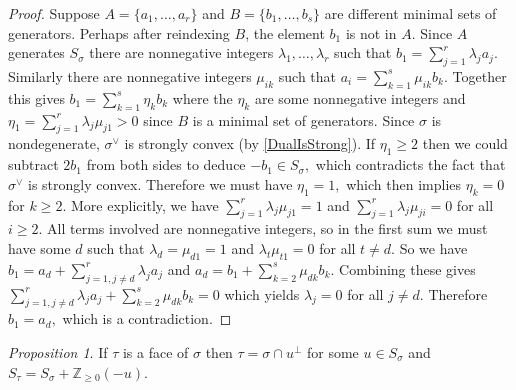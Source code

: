 \documentclass[BSc]{usydthesis}
\numberwithin{equation}{chapter}
\theoremstyle{remark}
\newtheorem{Proposition}[equation]{Proposition}
\newcommand{\Z}{\mathbb{Z}}
\newcommand{\V}{\vee}
\begin{document}
\begin{proof}
 Suppose $A=\{ a_1,\ldots, a_r \}$ and $B=\{ b_1, \ldots, b_s\}$ are different minimal sets of generators. Perhaps after reindexing $B$, the element $b_1$ is not in $A.$ Since $A$ generates $S_{\sigma}$ there are nonnegative integers $\lambda_1,\ldots, \lambda_r$ such that $b_1 =\displaystyle \sum_{j=1}^r \lambda_j a_j.$ Similarly there are nonnegative integers $\mu_{ik}$ such that $a_i =\displaystyle  \sum_{k=1}^s \mu_{ik} b_k.$ Together this gives $b_1 =\displaystyle  \sum_{k=1}^s \eta_k b_k$ where the $\eta_k$ are some nonnegative integers and $\eta_1 =\displaystyle  \sum_{j=1}^r \lambda_j \mu_{j1} >0$ since $B$ is a minimal set of generators. Since $\sigma$ is nondegenerate, $\sigma^{\V}$ is strongly convex (by \ref{DualIsStrong}). If $\eta_1\geq 2$ then we could subtract $2b_1$ from both sides to deduce $-b_1\in S_{\sigma},$ which contradicts the fact that $\sigma^{\V}$ is strongly convex. Therefore we must have $\eta_1=1,$ which then implies $\eta_k=0$ for $k\geq 2.$ More explicitly, we have $\displaystyle \sum_{j=1}^r \lambda_j \mu_{j1}=1$ and $\displaystyle \sum_{j=1}^r \lambda_j \mu_{ji}=0$ for all $i\geq 2.$ All terms involved are nonnegative integers, so in the first sum we must have some $d$ such that $\lambda_d=\mu_{d1}=1$ and $\lambda_t \mu_{t1}=0$ for all $t\neq d.$ So we have $\displaystyle b_1 = a_d + \sum_{j=1, j\neq d}^r \lambda_j a_j$ and $\displaystyle a_d = b_1 + \sum_{k=2}^s \mu_{dk} b_k.$ Combining these gives $\displaystyle \sum_{j=1, j\neq d}^r \lambda_j a_j + \sum_{k=2}^s \mu_{dk}b_k=0$ which yields $\lambda_j=0$ for all $j\neq d.$ Therefore $b_1=a_d,$ which is a contradiction.
\end{proof}

\begin{Proposition}\label{semigroup 1}
If $\tau$ is a face of $\sigma$ then $\tau = \sigma \cap u^{\perp}$ for some $u\in S_{\sigma}$ and $S_{\tau} = S_{\sigma} + \Z_{\geq 0} (-u).$
\end{Proposition}
\end{document}
